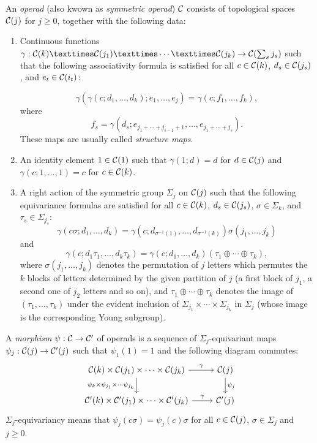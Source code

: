 \documentclass[TFM.tex]{subfiles}
\begin{document}
\begin{defi}\label{operadtop}
An \emph{operad} (also kwown as \emph{symmetric operad}) $\mathcal{C}$ consists of topological spaces $\mathcal{C}(j)$ for $j\geq 0$, %
together with the following data:
\begin{enumerate}[(1)]
\item Continuous functions $\gamma : \CC(k) × \CC(j_1) × \cdots × \CC(j_k) \to \CC(\sum_s j_s)$ such that the
following associativity formula is satisfied for all $c\in \mathcal{C}(k)$, $d_s \in \mathcal{C}(j_s)$, and $e_t \in \mathcal{C}(i_t)$:

\[\gamma(
\gamma(c; d_1, \dots , d_k); e_1, \dots , e_j) = 
\gamma(c; f_1, \dots , f_k),
\]
where $$f_s = \gamma(d_s; e_{j_1+\cdots+j_{s−1}+1}, \dots , e_{j_1+\cdots+j_s} ).$$%
These maps are usually called \emph{structure maps}.

\item An identity element $1 \in \mathcal{C}(1)$ such that 
$\gamma(1; d) = d$ for $d \in \mathcal{C}(j)$ and 
$\gamma(c; 1,\dots,1) = c$ for
$c \in \mathcal{C}(k)$.

\item A right action of the symmetric group $\Sigma_j$ on $\mathcal{C}(j)$ such that the following equivariance
formulas are satisfied for all $c\in \mathcal{C}(k)$, $d_s \in \mathcal{C}(j_s)$, $\sigma\in\Sigma_k$, and $\tau_s\in\Sigma_{j_s}$:
\[
\gamma(c\sigma; d_1, \dots , d_k) = 
\gamma(c; d_{\sigma^{−1}(1)}, \dots , d_{\sigma^{−1}(k)})\sigma(j_1, \dots , j_k)
\]
and 
\[
\gamma(c; d_1\tau_1, \dots , d_k\tau_k) = \gamma(c; d_1, \dots , d_k)(\tau_1\oplus\cdots\oplus\tau_k),
\] 
where $\sigma(j_1, \dots , j_k)$ denotes the
permutation of $j$ letters which permutes the $k$ blocks of letters determined by the given
partition of $j$ (a first block of $j_1$, a second one of $j_2$ letters and so on), and $\tau_1\oplus\cdots\oplus\tau_k$ denotes the image of $(\tau_1, \dots , \tau_k)$ under the evident inclusion of $\Sigma_{j_1} × \cdots × \Sigma_{j_k}$ in $\Sigma_j$ (whose image is the corresponding Young subgroup).
\end{enumerate}
\end{defi}



\begin{defi}
A \emph{morphism} $\psi:\mathcal{C} \to \mathcal{C}'$ of operads is a sequence of $\Sigma_j$-equivariant maps  $\psi_j : \mathcal{C}(j)\to \mathcal{C}'(j)$ such that
 $\psi_1(1) = 1$ and the following diagram commutes:
 \[
 \begin{tikzcd}
\CC(k)\times \CC(j_1)\times\cdots\times \CC(j_k) \arrow[r, "\gamma"] \arrow[d, "\psi_k\times\psi_{j_1}\times\cdots\psi_{j_k}"'] & \CC(j) \arrow[d, "\psi_j"] \\
\CC'(k)\times \CC'(j_1)\times\cdots\times \CC'(j_k) \arrow[r, "\gamma"]                                                         & \CC'(j)                   
\end{tikzcd}\]
$\Sigma_j$-equivariancy means that $\psi_j(c\sigma)=\psi_j(c)\sigma$ for all $c\in \mathcal{C}(j)$, $\sigma\in\Sigma_j$ and $j\geq 0$. 
\end{defi}
\end{document}
